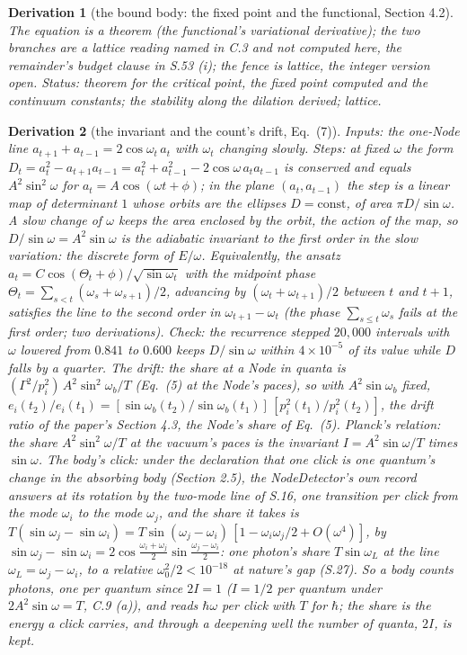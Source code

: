 \documentclass[pdflatex,sn-mathphys-num]{sn-jnl}
\theoremstyle{thmstyleone}
\newtheorem{derivation}{Derivation}
\begin{document}
\begin{derivation}[the bound body: the fixed point and the functional, Section 4.2]
The equation is a theorem (the functional's variational derivative); the two branches are a lattice reading named in C.3 and not computed here, the remainder's budget clause in S.53 (i); the fence is lattice, the integer version open.
 \emph{Status:} theorem for the critical point, the fixed point computed and the continuum constants; the stability along the dilation derived; lattice.
\end{derivation}

\begin{derivation}[the invariant and the count's drift, Eq.~(7)]
\emph{Inputs:} the one-Node line $a_{t+1} + a_{t-1} = 2\cos\omega_t\,a_t$ with $\omega_t$ changing slowly. \emph{Steps:} at fixed $\omega$ the form $D_t = a_t^2 - a_{t+1}a_{t-1} = a_t^2 + a_{t-1}^2 - 2\cos\omega\,a_t a_{t-1}$ is conserved and equals $A^2\sin^2\omega$ for $a_t = A\cos(\omega t + \phi)$; in the plane $(a_t, a_{t-1})$ the step is a linear map of determinant $1$ whose orbits are the ellipses $D = \text{const}$, of area $\pi D / \sin\omega$. A slow change of $\omega$ keeps the area enclosed by the orbit, the action of the map, so $D / \sin\omega = A^2\sin\omega$ is the adiabatic invariant to the first order in the slow variation: the discrete form of $E / \omega$. Equivalently, the ansatz $a_t = C\cos(\Theta_t + \phi) / \sqrt{\sin\omega_t}$ with the midpoint phase $\Theta_t = \sum_{s < t}(\omega_s + \omega_{s+1}) / 2$, advancing by $(\omega_t + \omega_{t+1}) / 2$ between $t$ and $t + 1$, satisfies the line to the second order in $\omega_{t+1} - \omega_t$ (the phase $\sum_{s \le t}\omega_s$ fails at the first order; two derivations). \emph{Check:} the recurrence stepped $20{,}000$ intervals with $\omega$ lowered from $0.841$ to $0.600$ keeps $D / \sin\omega$ within $4 \times 10^{-5}$ of its value while $D$ falls by a quarter. \emph{The drift:} the share at a Node in quanta is $(\Gamma^2 / p_i^2)\,A^2\sin^2\omega_b / T$ (Eq.~(5) at the Node's paces), so with $A^2\sin\omega_b$ fixed, $e_i(t_2) / e_i(t_1) = [\sin\omega_b(t_2) / \sin\omega_b(t_1)]\,[p_i^2(t_1) / p_i^2(t_2)]$, the drift ratio of the paper's Section 4.3, the Node's share of Eq.~(5). \emph{Planck's relation:} the share $A^2\sin^2\omega / T$ at the vacuum's paces is the invariant $I = A^2\sin\omega / T$ times $\sin\omega$. \emph{The body's click:} under the declaration that one click is one quantum's change in the absorbing body (Section 2.5), the NodeDetector's own record answers at its rotation by the two-mode line of S.16, one transition per click from the mode $\omega_i$ to the mode $\omega_j$, and the share it takes is $T(\sin\omega_j - \sin\omega_i) = T\sin(\omega_j - \omega_i)\,[1 - \omega_i\omega_j / 2 + O(\omega^4)]$, by $\sin\omega_j - \sin\omega_i = 2\cos\frac{\omega_i + \omega_j}{2}\sin\frac{\omega_j - \omega_i}{2}$: one photon's share $T\sin\omega_L$ at the line $\omega_L = \omega_j - \omega_i$, to a relative $\omega_0^2 / 2 < 10^{-18}$ at nature's gap (S.27). So a body counts photons, one per quantum since $2I = 1$ ($I = 1 / 2$ per quantum under $2A^2\sin\omega = T$, C.9 (a)), and reads $\hbar\omega$ per click with $T$ for $\hbar$; the share is the energy a click carries, and through a deepening well the number of quanta, $2I$, is kept.

\end{derivation}
\end{document}
